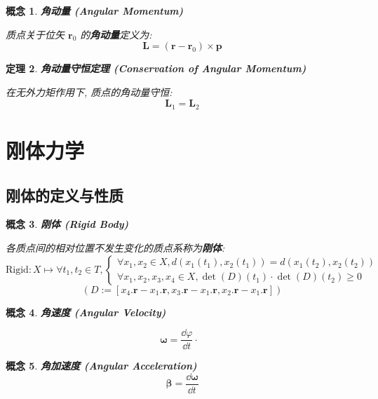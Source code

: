 \documentclass[UTF8]{ctexart}
\newcommand{\<}{\langle}
\renewcommand{\>}{\rangle}                              %
\newenvironment{dfn_box}{
    \begin{tcolorbox}[enhanced, colback=dfn_green2, boxrule=0pt, frame hidden,
        borderline west={0.7mm}{0.1mm}{dfn_green1},breakable]
    }
    {\end{tcolorbox}}
\newenvironment{thm_box}{
    \begin{tcolorbox}[enhanced, colback=thm_blue2, boxrule=0pt, frame hidden,
        borderline west={0.7mm}{0.1mm}{thm_blue1},breakable]
    }
    {\end{tcolorbox}}
\theoremstyle{MyStyle} %
\newtheorem{definition}{概念}[subsection]
\newenvironment{cpt}{\begin{dfn_box}\begin{definition}}{\end{definition}\end{dfn_box}}
\newtheorem{theorem}[definition]{定理}
\newenvironment{thm}{\begin{thm_box}\begin{theorem}}{\end{theorem}\end{thm_box}}
\DeclareMathOperator{\ihat}{\bm{\hat{\imath}}}
\begin{document}
        \begin{cpt}
            \textbf{角动量 (Angular Momentum)}

            质点关于位矢 \(\bm{r}_0\) 的\textbf{角动量}定义为: 
            \[\bm{L}=(\bm{r}-\bm{r}_0)\times\bm{p}\]
        \end{cpt}
        
        \begin{thm}
            \textbf{角动量守恒定理 (Conservation of Angular Momentum)}

            在无外力矩作用下, 质点的角动量守恒: 
            \[\bm{L}_1=\bm{L}_2\]
        \end{thm}

\section{刚体力学}
    
        \subsection{刚体的定义与性质}
            
            \begin{cpt}
                \textbf{刚体 (Rigid Body)}
    
                各质点间的相对位置不发生变化的质点系称为\textbf{刚体}: 
                \[\text{Rigid}:X\mapsto\forall t_1, t_2\in T, 
                \begin{cases}
                    \forall x_1,x_2\in X, d(x_1(t_1),x_2(t_1))=d(x_1(t_2), x_2(t_2))\\
                    \forall x_1,x_2,x_3,x_4\in X, \det(D)(t_1)\cdot\det(D)(t_2)\geq 0
                \end{cases}\]
                \[(D:=[x_4.\bm{r}-x_1.\bm{r}, x_3.\bm{r}-x_1.\bm{r}, x_2.\bm{r}-x_1.\bm{r}])\] 
            \end{cpt}
            
            \begin{cpt}
                \textbf{角速度 (Angular Velocity)}

                \[\bm{\omega}=\frac{\dd\varphi}{\dd t}\cdot\ihat\]
            \end{cpt}
            
            \begin{cpt}
                \textbf{角加速度 (Angular Acceleration)}
                \[\bm{\beta}=\frac{\dd\bm{\omega}}{\dd t}\]
            \end{cpt}
            
\end{document}
